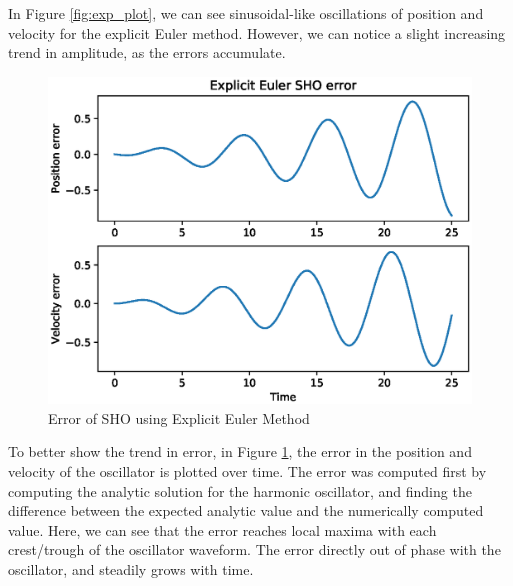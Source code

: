 \documentclass{article}
\begin{document}
In Figure \ref{fig:exp_plot}, we can see sinusoidal-like oscillations of position and velocity for the explicit Euler method.  However, we can notice a slight increasing trend in amplitude, as the errors accumulate.

\newpage

\begin{figure}[h!]
\centering
\includegraphics[scale=.75]{fig/explicit_error.eps}
\caption{Error of SHO using Explicit Euler Method}
\label{fig:exp_error}
\end{figure}

To better show the trend in error, in Figure \ref{fig:exp_error}, the error in the position and velocity of the oscillator is plotted over time.  The error was computed first by computing the analytic solution for the harmonic oscillator, and finding the difference between the expected analytic value and the numerically computed value.  Here, we can see that the error reaches local maxima with each crest/trough of the oscillator waveform.  The error directly out of phase with the oscillator, and steadily grows with time.  

\newpage
\end{document}
